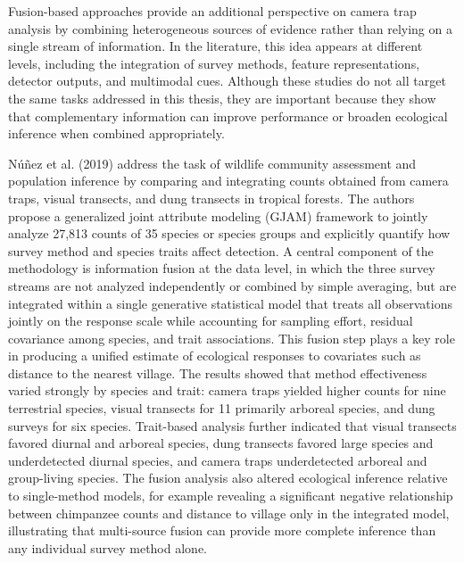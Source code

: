 Fusion-based approaches provide an additional perspective on camera trap analysis by combining heterogeneous sources of evidence rather than relying on a single stream of information. In the literature, this idea appears at different levels, including the integration of survey methods, feature representations, detector outputs, and multimodal cues. Although these studies do not all target the same tasks addressed in this thesis, they are important because they show that complementary information can improve performance or broaden ecological inference when combined appropriately.

Núñez et al. (2019) \cite{nunez2019stronger} address the task of wildlife community assessment and population inference by comparing and integrating counts obtained from camera traps, visual transects, and dung transects in tropical forests. The authors propose a generalized joint attribute modeling (GJAM) framework to jointly analyze 27,813 counts of 35 species or species groups and explicitly quantify how survey method and species traits affect detection. A central component of the methodology is information fusion at the data level, in which the three survey streams are not analyzed independently or combined by simple averaging, but are integrated within a single generative statistical model that treats all observations jointly on the response scale while accounting for sampling effort, residual covariance among species, and trait associations. This fusion step plays a key role in producing a unified estimate of ecological responses to covariates such as distance to the nearest village. The results showed that method effectiveness varied strongly by species and trait: camera traps yielded higher counts for nine terrestrial species, visual transects for 11 primarily arboreal species, and dung surveys for six species. Trait-based analysis further indicated that visual transects favored diurnal and arboreal species, dung transects favored large species and underdetected diurnal species, and camera traps underdetected arboreal and group-living species. The fusion analysis also altered ecological inference relative to single-method models, for example revealing a significant negative relationship between chimpanzee counts and distance to village only in the integrated model, illustrating that multi-source fusion can provide more complete inference than any individual survey method alone.

